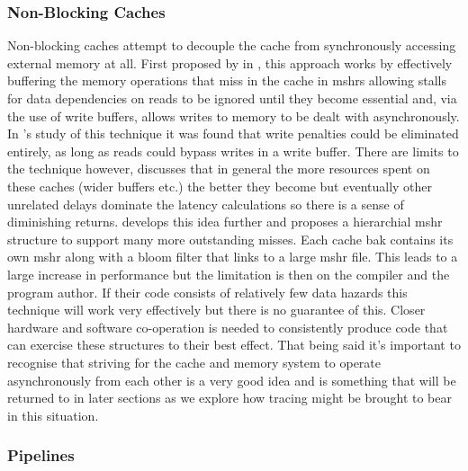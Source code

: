 \subsubsection{Non-Blocking Caches}

Non-blocking caches attempt to decouple the cache from synchronously accessing external memory at all. First proposed by \citet{kroftLockupfreeInstructionFetch1981} in \citeyear{kroftLockupfreeInstructionFetch1981}, this approach works by effectively buffering the memory operations that miss in the cache in \gls{mshr}s allowing stalls for data dependencies on reads to be ignored until they become essential and, via the use of write buffers, allows writes to memory to be dealt with asynchronously. In \citet{chenReducingMemoryLatency1992}'s study of this technique it was found that write penalties could be eliminated entirely, as long as reads could bypass writes in a write buffer. There are limits to the technique however, \citet{belaynehDiscussionNonblockingLockupfree1996} discusses that in general the more resources spent on these caches (wider buffers etc.) the better they become but eventually other unrelated delays dominate the latency calculations so there is a sense of diminishing returns. \citet{tuckScalableCacheMiss2006} develops this idea further and proposes a hierarchial \gls{mshr} structure to support many more outstanding misses. Each cache bak contains its own \gls{mshr} along with a bloom filter that links to a large \gls{mshr} file. This leads to a large increase in performance but the limitation is then on the compiler and the program author. If their code consists of relatively few data hazards this technique will work very effectively but there is no guarantee of this. Closer hardware and software co-operation is needed to consistently produce code that can exercise these structures to their best effect. That being said it's important to recognise that striving for the cache and memory system to operate asynchronously from each other is a very good idea and is something that will be returned to in later sections as we explore how tracing might be brought to bear in this situation.

\subsubsection{Pipelines}

